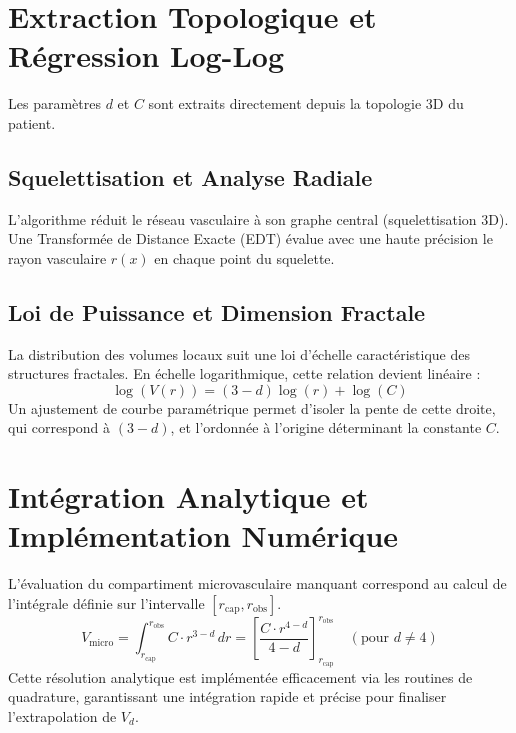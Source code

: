 \documentclass[11pt,a4paper]{article}
\begin{document}
\section{Extraction Topologique et Régression Log-Log}
Les paramètres $d$ et $C$ sont extraits directement depuis la topologie 3D du patient.
\subsection{Squelettisation et Analyse Radiale}
L'algorithme réduit le réseau vasculaire à son graphe central (squelettisation 3D). Une Transformée de Distance Exacte (EDT) évalue avec une haute précision le rayon vasculaire $r(x)$ en chaque point du squelette.

\subsection{Loi de Puissance et Dimension Fractale}
La distribution des volumes locaux suit une loi d'échelle caractéristique des structures fractales. En échelle logarithmique, cette relation devient linéaire :
\begin{equation}
    \log(V(r)) = (3-d)\log(r) + \log(C)
\end{equation}
Un ajustement de courbe paramétrique permet d'isoler la pente de cette droite, qui correspond à $(3-d)$, et l'ordonnée à l'origine déterminant la constante $C$. 

\section{Intégration Analytique et Implémentation Numérique}
L'évaluation du compartiment microvasculaire manquant correspond au calcul de l'intégrale définie sur l'intervalle $[r_{\text{cap}}, r_{\text{obs}}]$. 
\begin{equation}
    V_{\text{micro}} = \int_{r_{\text{cap}}}^{r_{\text{obs}}} C \cdot r^{3-d} \, dr = \left[ \frac{C \cdot r^{4-d}}{4-d} \right]_{r_{\text{cap}}}^{r_{\text{obs}}} \quad (\text{pour } d \neq 4)
\end{equation}
Cette résolution analytique est implémentée efficacement via les routines de quadrature, garantissant une intégration rapide et précise pour finaliser l'extrapolation de $V_d$.
\end{document}
